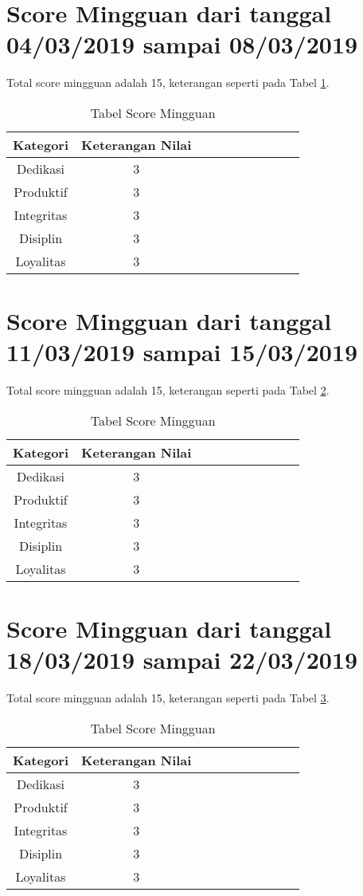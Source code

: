 \section{Score Mingguan dari tanggal 04/03/2019 sampai 08/03/2019}
Total score mingguan adalah 15,  keterangan seperti pada Tabel \ref{table:scoremingguan2}.
\begin{table}[!ht]
\centering
\begin{tabular}{ |c|c|c|c|c|c|c|c|c|c| }
\hline
Kategori & Keterangan Nilai \\
\hline
Dedikasi & 3 \\
\hline
Produktif & 3 \\
\hline
Integritas & 3 \\
\hline
Disiplin & 3 \\
\hline
Loyalitas & 3 \\
\hline
\end{tabular}
\caption{Tabel Score Mingguan}
\label{table:scoremingguan2}
\end{table}




\section{Score Mingguan dari tanggal 11/03/2019 sampai 15/03/2019}
Total score mingguan adalah 15,  keterangan seperti pada Tabel \ref{table:scoremingguan3}.
\begin{table}[!ht]
\centering
\begin{tabular}{ |c|c|c|c|c|c|c|c|c|c| }
\hline
Kategori & Keterangan Nilai \\
\hline
Dedikasi & 3 \\
\hline
Produktif & 3 \\
\hline
Integritas & 3 \\
\hline
Disiplin & 3 \\
\hline
Loyalitas & 3 \\
\hline
\end{tabular}
\caption{Tabel Score Mingguan}
\label{table:scoremingguan3}
\end{table}


\section{Score Mingguan dari tanggal 18/03/2019 sampai 22/03/2019}
Total score mingguan adalah 15,  keterangan seperti pada Tabel \ref{table:scoremingguan4}.
\begin{table}[!ht]
\centering
\begin{tabular}{ |c|c|c|c|c|c|c|c|c|c| }
\hline
Kategori & Keterangan Nilai \\
\hline
Dedikasi & 3 \\
\hline
Produktif & 3 \\
\hline
Integritas & 3 \\
\hline
Disiplin & 3 \\
\hline
Loyalitas & 3 \\
\hline
\end{tabular}
\caption{Tabel Score Mingguan}
\label{table:scoremingguan4}
\end{table}



